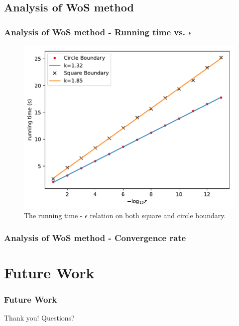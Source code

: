 \documentclass{beamer}
\begin{document}

\subsection{Analysis of WoS method}

\begin{frame}
\frametitle{Analysis of WoS method - Running time vs. $\epsilon$}
\begin{figure}[htbp]
    \centering
    \includegraphics[width=.75\textwidth]{./figs/ep_t}
    \caption{\label{fig:ep_t} The running time - $\epsilon$ relation on both square and circle boundary.}
\end{figure}
\end{frame}

\begin{frame}
\frametitle{Analysis of WoS method - Convergence rate}

\end{frame}


\section{Future Work}

\begin{frame}
\frametitle{Future Work}

\end{frame}


\begin{frame}
\Huge{\centerline{Thank you! Questions?}}
\end{frame}

\end{document}
